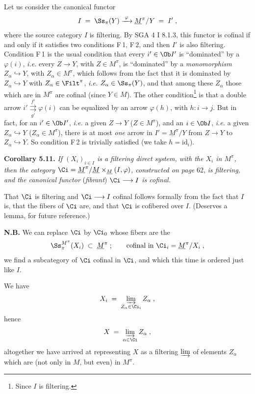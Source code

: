 Let us consider the canonical functor
\[
I \;=\; \Ss_\pi(Y) \xrightarrow{\;\varphi\;} \underline{M}^\pi/Y \;=\; I' \;,
\]
where the source category $I$ is filtering. By SGA 4 I 8.1.3, this functor is cofinal if and only if it satisfies two conditions F\,1, F\,2, and then $I'$ is also filtering. Condition F\,1 is the usual condition that every $i' \in \Ob I'$ is ``dominated'' by a $\varphi(i)$, \textit{i.e.} every $Z \longrightarrow Y$, with $Z \in M^\pi$, is ``dominated'' by a \textit{monomorphism} $Z_\alpha \hookrightarrow Y$, with $Z_\alpha \in M^\pi$, which follows from the fact that it is dominated by $Z_\alpha \hookrightarrow Y$ with $Z_\alpha \in \Filt^\pi$, \textit{i.e.} $Z_\alpha \in \Ss_\pi(Y)$, and that among these $Z_\alpha$ those which are in $M^\pi$ are cofinal (since $Y \in M$). The other condition\footnote[23]{Since $I$ is filtering.} is that a double arrow $i' \overset{f'}{\underset{g'}{\rightrightarrows}} \varphi(i)$ can
be equalized by an arrow $\varphi(h)$, with $h : i \longrightarrow j$. But in fact, for an $i' \in \Ob I'$, \textit{i.e.} a given $Z \longrightarrow Y$ ($Z \in M^\pi$), and an $i \in \Ob I$, \textit{i.e.} a given $Z_\alpha \hookrightarrow Y$ ($Z_\alpha \in M^\pi$), there is at most \textit{one} arrow in $I' = \underline{M}^\pi/Y$ from $Z \longrightarrow Y$ to $Z_\alpha \hookrightarrow Y$. So condition F\,2 is trivially satisfied (we take $h = \mathrm{id}_i$).

\textbf{Corollary 5.11.} \textit{If $(X_i)_{i \in I}$ is a filtering direct system, with the $X_i$ in $M^\pi$, then the category $\Ci = \underline{M}^\pi/\underline{M} \times_{\underline{M}} (I,\varphi)$, constructed on page} 62, \textit{is filtering, and the canonical functor} (\textit{fibrant}) \textit{$\Ci \longrightarrow I$ is cofinal.}

That $\Ci$ is filtering and $\Ci \longrightarrow I$ cofinal follows formally from the fact that $I$ is, that the fibers of $\Ci$ are, and that $\Ci$ is cofibered over $I$. (Deserves a lemma, for future reference.)

\textbf{N.B.} We can replace $\Ci$ by $\Ci_0$ whose fibers are the
\[
\Ss_\pi^{M^\pi}(X_i) \;\subset\; \underline{M}^\pi \;; \qquad \text{cofinal in } \Ci_i = \underline{M}^\pi/X_i \;,
\]
we find a subcategory of $\Ci$ cofinal in $\Ci$, and which this time is ordered just like $I$.

We have
\[
X_i \;=\; \varinjlim_{Z_\alpha \in \Ci_i} Z_\alpha \;,
\]
hence
\[
X \;=\; \varinjlim_{\alpha \in \Ci} Z_\alpha \;,
\]
altogether we have arrived at representing $X$ as a filtering $\varinjlim$ of elements $Z_\alpha$ which are (not only in $M$, but even) in $M^\pi$.

